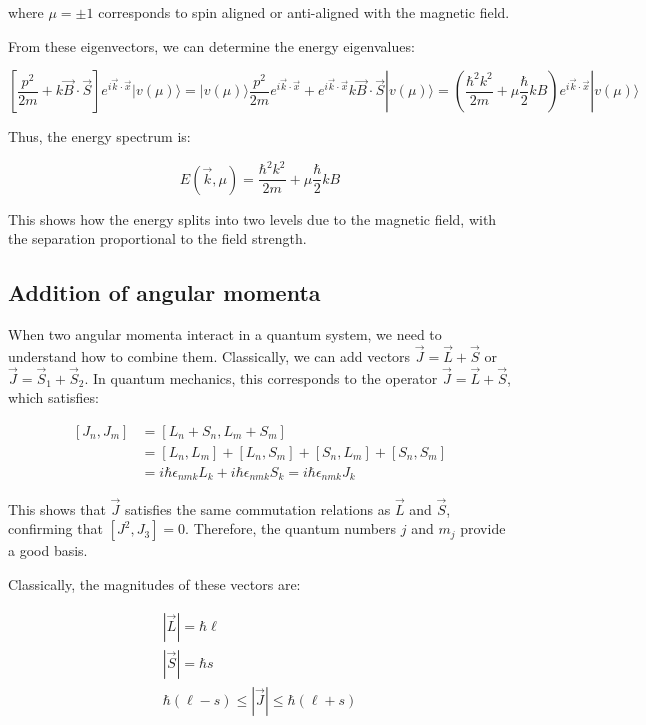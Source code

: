 \documentclass[italian]{HKNdocument}
\begin{document}
where $\mu = \pm 1$ corresponds to spin aligned or anti-aligned with the magnetic field.


From these eigenvectors, we can determine the energy eigenvalues:

\begin{equation}
\left[\frac{p^{2}}{2 m}+k \vec{B} \cdot \vec{S}\right] e^{i \vec{k} \cdot \vec{x}}|v(\mu)\rangle=|v(\mu)\rangle \frac{p^{2}}{2 m} e^{i \vec{k} \cdot \vec{x}}+e^{i \vec{k} \cdot \vec{x}} k \vec{B} \cdot \vec{S}|v(\mu)\rangle=\left(\frac{\hbar^{2} k^{2}}{2 m}+\mu \frac{\hbar}{2} k B\right) e^{i \vec{k} \cdot \vec{x}}|v(\mu)\rangle
\end{equation}

Thus, the energy spectrum is:

\begin{equation}
E(\vec{k}, \mu)=\frac{\hbar^{2} k^{2}}{2 m}+\mu \frac{\hbar}{2} k B
\end{equation}

This shows how the energy splits into two levels due to the magnetic field, with the separation proportional to the field strength.

\subsection{Addition of angular momenta}
When two angular momenta interact in a quantum system, we need to understand how to combine them. Classically, we can add vectors $\vec{J}=\vec{L}+\vec{S}$ or $\vec{J}=\vec{S}_1+\vec{S}_2$. In quantum mechanics, this corresponds to the operator $\vec{J}=\vec{L}+\vec{S}$, which satisfies:

\begin{align}
\left[J_{n}, J_{m}\right] &= \left[L_{n}+S_{n}, L_{m}+S_{m}\right]\\
&= \left[L_{n}, L_{m}\right]+\left[L_{n}, S_{m}\right]+\left[S_{n}, L_{m}\right]+\left[S_{n}, S_{m}\right]\\
&= i \hbar \epsilon_{n m k} L_{k}+i \hbar \epsilon_{n m k} S_{k}=i \hbar \epsilon_{n m k} J_{k}
\end{align}

This shows that $\vec{J}$ satisfies the same commutation relations as $\vec{L}$ and $\vec{S}$, confirming that $\left[J^{2}, J_{3}\right]=0$. Therefore, the quantum numbers $j$ and $m_j$ provide a good basis.

Classically, the magnitudes of these vectors are:

\[
\begin{array}{r}
|\vec{L}|=\hbar \ell \\
|\vec{S}|=\hbar s  \\
\hbar(\ell-s) \leq|\vec{J}| \leq \hbar(\ell+s)
\end{array}
\]
\end{document}
